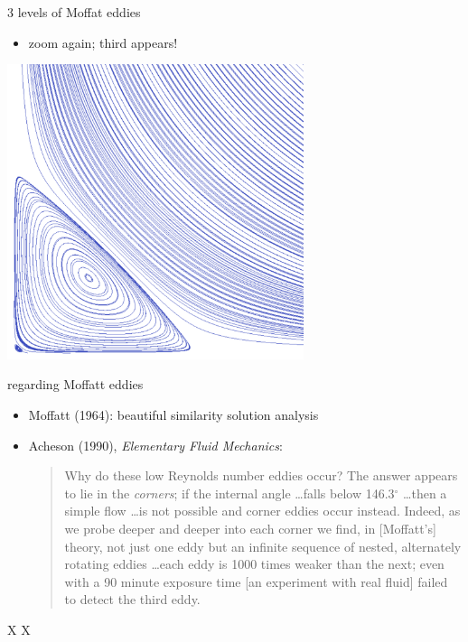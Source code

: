 \documentclass[hide notes,intlimits,usenames,dvipsnames]{beamer}
\begin{document}
\begin{frame}{3 levels of Moffat eddies}

\begin{itemize}
\item zoom again; third appears!
\end{itemize}

\begin{center}
\includegraphics[width=0.65\textwidth]{lidbox-streamlines-zoom2}
\end{center}
\end{frame}


\begin{frame}{regarding Moffatt eddies}

\begin{itemize}
\item Moffatt (1964): beautiful similarity solution analysis
\item Acheson (1990), \emph{Elementary Fluid Mechanics}:
    \begin{quote}
    Why do these low Reynolds number eddies occur?  The answer appears to lie in the \emph{corners}; if the internal angle \dots falls below 146.3$^\circ$ \dots then a simple flow \dots is not possible and corner eddies occur instead.  Indeed, as we probe deeper and deeper into each corner we find, in [Moffatt's] theory, not just one eddy but an infinite sequence of nested, alternately rotating eddies \dots each eddy is 1000 times weaker than the next; even with a 90 minute exposure time [an experiment with real fluid] failed to detect the third eddy.
    \end{quote}
\end{itemize}

\end{frame}


\begin{frame}{X}
X
\end{frame}
\end{document}
